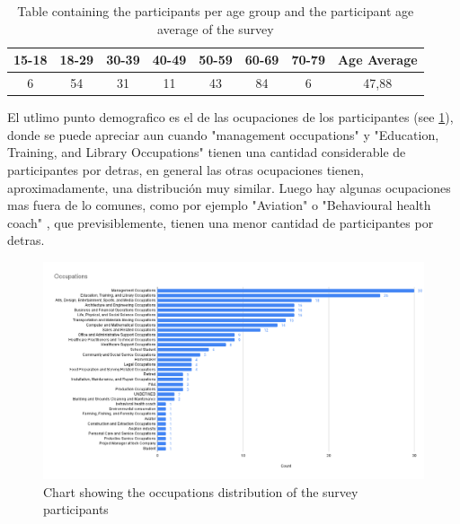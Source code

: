 \FloatBarrier
\begin{table}[!htbp]
    \centering
    \begin{adjustbox}{width=1\textwidth,center=\textwidth}
        \begin{tabular}{|c|c|c|c|c|c|c|c|}
        \hline
        15-18 & 18-29 & 30-39 & 40-49 & 50-59 & 60-69 & 70-79 & Age Average \\ \hline
        6 & 54 & 31 & 11 & 43 & 84 & 6 & 47,88 \\ \hline
        \end{tabular}
    \end{adjustbox}
    \caption{Table containing the participants per age group and the participant age average of the survey}
    \label{tab:surveyAgeTable}
\end{table}
\FloatBarrier

El utlimo punto demografico es el de las ocupaciones de los participantes (see \ref{fig:surveyOccupations}), donde se puede apreciar aun cuando "management occupations" y "Education, Training, and Library Occupations" tienen una cantidad considerable de participantes por detras, en general las otras ocupaciones tienen, aproximadamente, una distribución muy similar. Luego hay algunas ocupaciones mas fuera de lo comunes, como por ejemplo "Aviation" o "Behavioural health coach" , que previsiblemente, tienen una menor cantidad de participantes por detras. 

\FloatBarrier
\begin{figure}[!htbp]
    \centering
    \includegraphics[width=15cm]{Images/General/03_user_centered_design/Survey/Occupations.png}
    \caption{Chart showing the occupations distribution of the survey participants}
    \label{fig:surveyOccupations}
\end{figure}
\FloatBarrier

